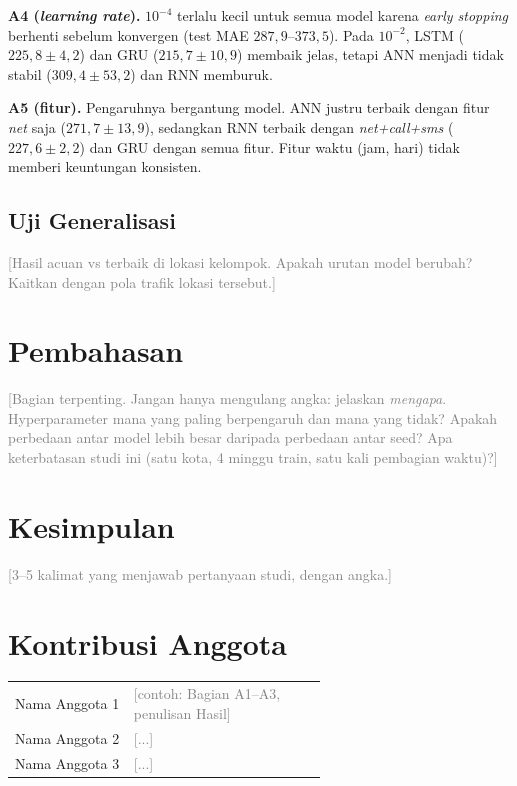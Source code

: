 \documentclass[conference,a4paper]{IEEEtran}
\newcommand{\petunjuk}[1]{\textcolor{gray}{[#1]}}
\begin{document}
\textbf{A4 (\textit{learning rate}).} $10^{-4}$ terlalu kecil untuk semua model
karena \textit{early stopping} berhenti sebelum konvergen (test MAE $287{,}9$--$373{,}5$).
Pada $10^{-2}$, LSTM ($225{,}8 \pm 4{,}2$) dan GRU ($215{,}7 \pm 10{,}9$)
membaik jelas, tetapi ANN menjadi tidak stabil ($309{,}4 \pm 53{,}2$) dan RNN memburuk.

\textbf{A5 (fitur).} Pengaruhnya bergantung model. ANN justru terbaik dengan
fitur \textit{net} saja ($271{,}7 \pm 13{,}9$), sedangkan RNN terbaik dengan
\textit{net+call+sms} ($227{,}6 \pm 2{,}2$) dan GRU dengan semua fitur.
Fitur waktu (jam, hari) tidak memberi keuntungan konsisten.

\subsection{Uji Generalisasi}
\petunjuk{Hasil acuan vs terbaik di lokasi kelompok. Apakah urutan model berubah? Kaitkan dengan pola trafik lokasi tersebut.}

\section{Pembahasan}
\petunjuk{Bagian terpenting. Jangan hanya mengulang angka: jelaskan \emph{mengapa}. Hyperparameter mana yang paling berpengaruh dan mana yang tidak? Apakah perbedaan antar model lebih besar daripada perbedaan antar seed? Apa keterbatasan studi ini (satu kota, 4 minggu train, satu kali pembagian waktu)?}

\section{Kesimpulan}
\petunjuk{3--5 kalimat yang menjawab pertanyaan studi, dengan angka.}

\section*{Kontribusi Anggota}
\begin{tabular}{@{}lp{0.62\linewidth}@{}}
  Nama Anggota 1 & \petunjuk{contoh: Bagian A1--A3, penulisan Hasil} \\
  Nama Anggota 2 & \petunjuk{...} \\
  Nama Anggota 3 & \petunjuk{...} \\
\end{tabular}
\end{document}
